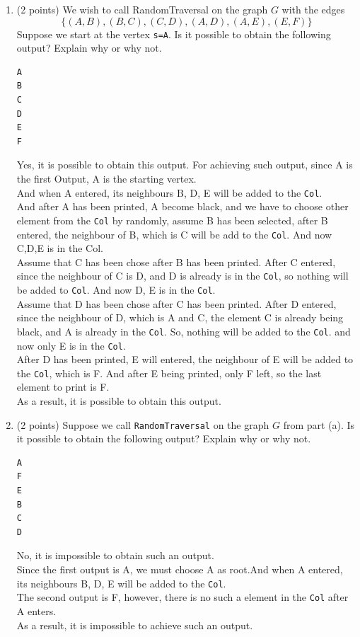 \documentclass{assignment-263}
\begin{document}
\begin{enumerate}
\begin{enumerate}
\item (2 points)
We wish to call RandomTraversal on the graph $G$ with the edges
$$\{(A, B), (B, C), (C, D), (A, D), (A, E), (E, F)\}$$
Suppose we start at the vertex \verb|s=A|.
Is it possible to obtain the following output? Explain why or why not. 
\begin{verbatim}
A
B
C
D
E
F
\end{verbatim}
Yes, it is possible to obtain this output. For achieving such output, since A is the first Output, A is the starting vertex.\\
And when A entered, its neighbours B, D, E will be added to the \verb|Col|. \\
And after A has been printed, A become black, and we have to choose other element from the \verb|Col| by randomly, assume B has been selected, after B entered, the neighbour of B, which is C will be add to the \verb|Col|. And now C,D,E is in the Col.\\
Assume that C has been chose after B has been printed. After C entered, since the neighbour of C is D, and D is already is in the \verb|Col|, so nothing will be added to \verb|Col|. And now D, E is in the \verb|Col|.\\
Assume that D has been chose after C has been printed. After D entered, since the neighbour of D, which is A and C, the element C is already being black, and A is already in the \verb|Col|. So, nothing will be added to the \verb|Col|. and now only E is in the \verb|Col|.\\
After D has been printed, E will entered, the neighbour of E will be added to the \verb|Col|, which is F. And after E being printed, only F left, so the last element to print is F.\\
As a result, it is possible to obtain this output.
\item (2 points)
Suppose we call \verb|RandomTraversal| on the graph $G$ from part (a).
Is it possible to obtain the following output? Explain why or why not. 
\begin{verbatim}
A
F
E
B
C
D
\end{verbatim}
No, it is impossible to obtain such an output.\\
Since the first output is A, we must choose A as root.And when A entered, its neighbours B, D, E will be added to the \verb|Col|. \\
The second output is F, however, there is no such a element in the \verb|Col| after A enters.\\
As a result, it is impossible to achieve such an output.



\end{enumerate}
\end{enumerate}
\end{document}
